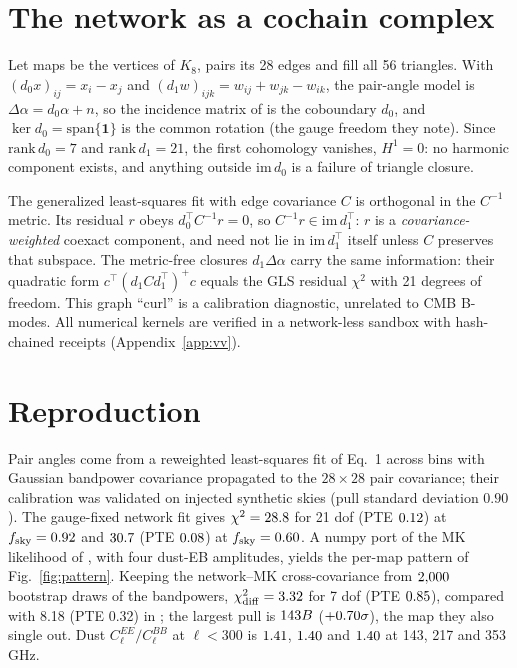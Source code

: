 \documentclass[twocolumn]{aastex631}
\begin{document}
\section{The network as a cochain complex}
Let maps be the vertices of $K_8$, pairs its 28 edges and fill all 56 triangles. With
$(d_0x)_{ij}=x_i-x_j$ and $(d_1w)_{ijk}=w_{ij}+w_{jk}-w_{ik}$, the pair-angle model is
$\Delta\alpha=d_0\alpha+n$, so the incidence matrix of \citet{lka2026} is the coboundary $d_0$, and
$\ker d_0=\mathrm{span}\{\mathbf 1\}$ is the common rotation (the gauge freedom they note). Since
$\mathrm{rank}\,d_0=7$ and $\mathrm{rank}\,d_1=21$, the first cohomology vanishes, $H^1=0$: no
harmonic component exists, and anything outside $\mathrm{im}\,d_0$ is a failure of triangle
closure.

The generalized least-squares fit with edge covariance $C$ is orthogonal in the $C^{-1}$ metric.
Its residual $r$ obeys $d_0^{\!\top}C^{-1}r=0$, so $C^{-1}r\in\mathrm{im}\,d_1^{\!\top}$: $r$ is a
\emph{covariance-weighted} coexact component, and need not lie in $\mathrm{im}\,d_1^{\!\top}$
itself unless $C$ preserves that subspace. The metric-free closures $d_1\Delta\alpha$ carry the
same information: their quadratic form $c^{\!\top}(d_1Cd_1^{\!\top})^{+}c$ equals the GLS residual
$\chi^2$ with 21 degrees of freedom. This graph ``curl'' is a calibration diagnostic, unrelated to
CMB B-modes. All numerical kernels are verified in a network-less sandbox with hash-chained
receipts (Appendix~\ref{app:vv}).

\section{Reproduction}
Pair angles come from a reweighted least-squares fit of Eq.~1 across bins with Gaussian bandpower
covariance propagated to the $28\times28$ pair covariance; their calibration was validated on
injected synthetic skies (pull standard deviation $0.90$). The gauge-fixed network fit gives
$\chi^2=28.8$ for 21 dof (PTE $0.12$) at $f_{\rm sky}=0.92$ and $30.7$ (PTE $0.08$) at
$f_{\rm sky}=0.60$. A numpy port of the MK likelihood of \citet{lka2026}, with four dust-EB
amplitudes, yields the per-map pattern of Fig.~\ref{fig:pattern}. Keeping the network--MK
cross-covariance from $2{,}000$ bootstrap draws of the bandpowers, $\chi^2_{\rm diff}=3.32$
for 7 dof (PTE $0.85$), compared with 8.18 (PTE 0.32) in \citet{lka2026}; the largest pull is
$143B$ ($+0.70\sigma$), the map they also single out. Dust $C_\ell^{EE}/C_\ell^{BB}$ at
$\ell<300$ is $1.41$, $1.40$ and $1.40$ at 143, 217 and 353\,GHz.
\end{document}
